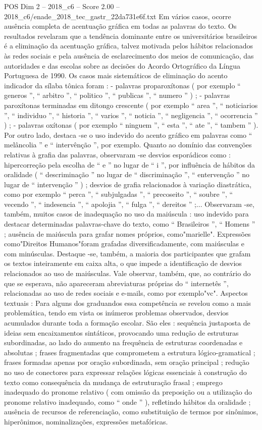 \begin{textsample}{POS Dim 2 – 2018\_c6 – Score 2.00 – 2018\_c6/enade\_2018\_tec\_gastr\_22da731e6f.txt}
Em vários casos, ocorre ausência completa de acentuação gráfica em todas as palavras do texto.
Os resultados revelaram que a tendência dominante entre os universitários brasileiros é a eliminação da acentuação gráfica, talvez motivada pelos hábitos relacionados às redes sociais e pela ausência de esclarecimento dos meios de comunicação, das autoridades e das escolas sobre as decisões do Acordo Ortográfico da Língua Portuguesa de 1990.
Os casos mais sistemáticos de eliminação do acento indicador da sílaba tônica foram : - palavras proparoxítonas ( por exemplo “ generos ”, “ arbitro ”, “ politico ”, “ publicas ”, “ numero ” ) ; - palavras paroxítonas terminadas em ditongo crescente ( por exemplo “ area ”, “ noticiarios ”, “ individuo ”, “ historia ”, “ varios ”, “ noticia ”, “ negligencia ”, “ ocorrencia ” ) ; - palavras oxítonas ( por exemplo “ ninguem ”, “ esta ”, “ ate ”, “ tambem ” ).
Por outro lado, destaca -se o uso indevido do acento gráfico em palavras como “ melâncolia ” e “ intervênção ”, por exemplo.
Quanto ao domínio das convenções relativas à grafia das palavras, observaram -se desvios esporádicos como : hipercorreção pela escolha de “ e ” no lugar de “ i ”, por influência de hábitos da oralidade ( “ descriminação ” no lugar de “ discriminação ”, “ entervenção ” no lugar de “ intervenção ” ) ; desvios de grafia relacionados à variação diastrática, como por exemplo “ perca ”, “ subjulgadas ”, “ precoseito ”, “ soubre ”, “ vecendo ”, “ indesencia ”, “ apolojia ”, “ fulga ”, “ dereitos ” ;...
Observaram -se, também, muitos casos de inadequação no uso da maiúscula : uso indevido para destacar determinadas palavras-chave do texto, como “ Brasileiros ”, “ Homens ” ; ausência de maiúscula para grafar nomes próprios, como"marielle".
Expressões como"Direitos Humanos"foram grafadas diversificadamente, com maiúsculas e com minúsculas.
Destaque -se, também, a maioria dos participantes que grafam os textos inteiramente em caixa alta, o que impede a identificação de desvios relacionados ao uso de maiúsculas.
Vale observar, também, que, ao contrário do que se esperava, não apareceram abreviaturas próprias do “ internetês ”, relacionadas ao uso de redes sociais e e-mails, como por exemplo"vc".
Aspectos textuais : Para alguns dos graduandos essa competência se revelou como a mais problemática, tendo em vista os inúmeros problemas observados, desvios acumulados durante toda a formação escolar.
São eles : sequência justaposta de ideias sem encaixamentos sintáticos, provocando uma redução de estruturas subordinadas, ao lado do aumento na frequência de estruturas coordenadas e absolutas ; frases fragmentadas que comprometem a estrutura lógico-gramatical ; frases formadas apenas por oração subordinada, sem oração principal ; redução no uso de conectores para expressar relações lógicas essenciais à construção do texto como consequência da mudança de estruturação frasal ; emprego inadequado do pronome relativo ( com omissão da preposição ou a utilização do pronome relativo inadequado, como “ onde ” ), refletindo hábitos da oralidade ; ausência de recursos de referenciação, como substituição de termos por sinônimos, hiperônimos, nominalizações, expressões metafóricas.

\end{textsample}
